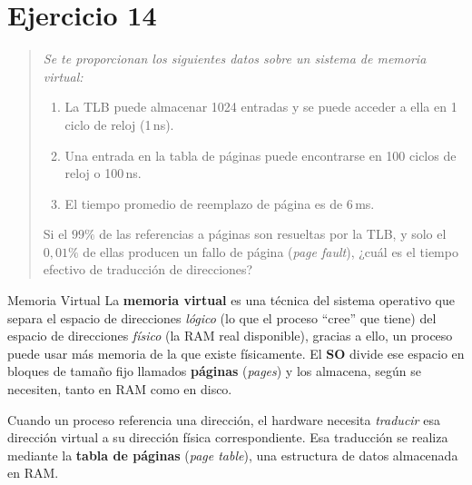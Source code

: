 \documentclass[12pt,letterpaper]{article}
\begin{document}


\section*{Ejercicio 14}

\begin{quote}
  \itshape
  Se te proporcionan los siguientes datos sobre un sistema de memoria virtual:
  \begin{enumerate}[label=(\alph*)]
    \item La TLB puede almacenar 1024 entradas y se puede acceder a ella
          en 1 ciclo de reloj (1\,ns).
    \item Una entrada en la tabla de páginas puede encontrarse en 100 ciclos
          de reloj o 100\,ns.
    \item El tiempo promedio de reemplazo de página es de 6\,ms.
  \end{enumerate}
  Si el $99\%$ de las referencias a páginas son resueltas por la TLB, y solo
  el $0{,}01\%$ de ellas producen un fallo de página (\textit{page fault}),
  ¿cuál es el tiempo efectivo de traducción de direcciones?
\end{quote}

\begin{conceptbox}{Memoria Virtual}
  La \textbf{memoria virtual} es una técnica del sistema operativo que separa el espacio de direcciones
  \emph{lógico} (lo que el proceso ``cree'' que tiene) del espacio de direcciones \emph{físico}
  (la RAM real disponible), gracias a ello, un proceso puede usar más memoria de la que existe físicamente. El \textbf{SO} divide ese espacio en bloques de tamaño fijo llamados \textbf{páginas} (\emph{pages}) y los almacena, según se necesiten, tanto en RAM como en disco.
\end{conceptbox}

\medskip

\noindent
Cuando un proceso referencia una dirección, el hardware necesita \textit{traducir} esa dirección virtual a su dirección física correspondiente. Esa traducción se realiza mediante la \textbf{tabla de páginas} (\textit{page table}), una estructura de datos almacenada en RAM.

\medskip
\end{document}
